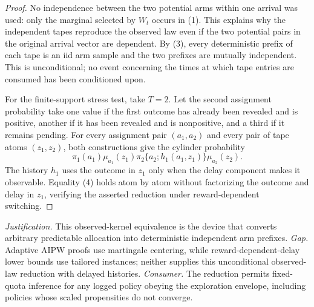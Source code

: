 \documentclass{article}
\begin{document}
\begin{proof}
No independence between the two potential arms within one arrival was used: only the marginal selected by \(W_t\) occurs in (1).  This explains why the independent tapes reproduce the observed law even if the two potential pairs in the original arrival vector are dependent.  By (3), every deterministic prefix of each tape is an iid arm sample and the two prefixes are mutually independent.  This is unconditional; no event concerning the times at which tape entries are consumed has been conditioned upon.

For the finite-support stress test, take \(T=2\).  Let the second assignment probability take one value if the first outcome has already been revealed and is positive, another if it has been revealed and is nonpositive, and a third if it remains pending.  For every assignment pair \((a_1,a_2)\) and every pair of tape atoms \((z_1,z_2)\), both constructions give the cylinder probability
\[
 \pi_1(a_1)\mu_{a_1}(z_1)
 \pi_2\{a_2;h_1(a_1,z_1)\}\mu_{a_2}(z_2).                              \tag{4}
\]
The history \(h_1\) uses the outcome in \(z_1\) only when the delay component makes it observable.  Equality (4) holds atom by atom without factorizing the outcome and delay in \(z_1\), verifying the asserted reduction under reward-dependent switching.
\end{proof}
\par\smallskip\noindent \textit{Justification.} This observed-kernel equivalence is the device that converts arbitrary predictable allocation into deterministic independent arm prefixes. \textit{Gap.} Adaptive AIPW proofs use martingale centering, while reward-dependent-delay lower bounds use tailored instances; neither supplies this unconditional observed-law reduction with delayed histories. \textit{Consumer.} The reduction permits fixed-quota inference for any logged policy obeying the exploration envelope, including policies whose scaled propensities do not converge.
\end{document}
